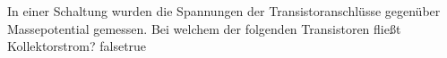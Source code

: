     {In einer Schaltung wurden die Spannungen der Transistoranschlüsse gegenüber Massepotential gemessen. Bei welchem der folgenden Transistoren fließt Kollektorstrom?}
    {}
    {}
    {}
    {}
    {false}{true}